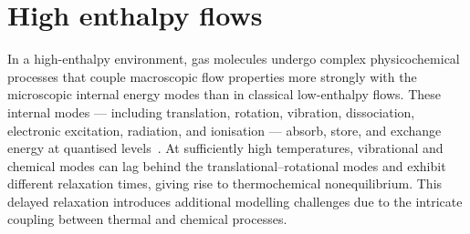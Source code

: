 \section{High enthalpy flows}
In a high-enthalpy environment, gas molecules undergo complex physicochemical processes that couple macroscopic flow properties more strongly with the microscopic internal energy modes than in classical low-enthalpy flows. These internal modes — including translation, rotation, vibration, dissociation, electronic excitation, radiation, and ionisation — absorb, store, and exchange energy at quantised levels~\cite[ch.~11]{Anderson2019}. At sufficiently high temperatures, vibrational and chemical modes can lag behind the translational–rotational modes and exhibit different relaxation times, giving rise to thermochemical nonequilibrium. This delayed relaxation introduces additional modelling challenges due to the intricate coupling between thermal and chemical processes.




